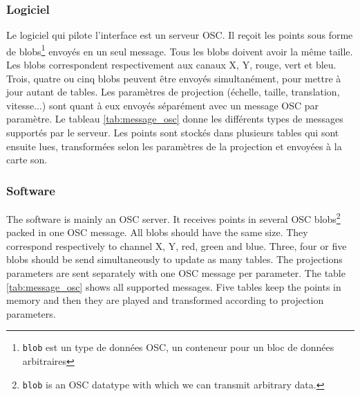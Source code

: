 \begin{fr}
\subsubsection{Logiciel}

Le logiciel qui pilote l'interface est un serveur OSC. 
Il reçoit les points sous forme de blobs\footnote{\texttt{blob} est un type de données OSC, un conteneur pour un bloc de données arbitraires} envoyés en un seul message.
Tous les blobs doivent avoir la même taille.
Les blobs correspondent respectivement aux canaux X, Y, rouge, vert et bleu.
Trois, quatre ou cinq blobs peuvent être envoyés simultanément, pour mettre à jour autant de tables.
Les paramètres de projection (échelle, taille, translation, vitesse...) sont quant à eux envoyés séparément avec un message OSC par paramètre. 
Le tableau \ref{tab:message_osc} donne les différents types de messages supportés par le serveur.
Les points sont stockés dans plusieurs tables qui sont ensuite lues, transformées selon les paramètres de la projection et envoyées à la carte son.
\end{fr}

\begin{en}
\subsubsection{Software}
The software is mainly an OSC server.
It receives points in several OSC blobs\footnote{\texttt{blob} is an OSC datatype with which we can transmit arbitrary data.} packed in one OSC message.
All blobs should have the same size.
They correspond respectively to channel X, Y, red, green and blue.
Three, four or five blobs should be send simultaneously to update as many tables.
The projections parameters are sent separately with one OSC message per parameter.
The table \ref{tab:message_osc} shows all supported messages.
Five tables keep the points in memory and then they are played and transformed according to projection parameters.
\end{en}


